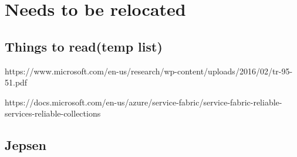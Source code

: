 \documentclass[a4paper,10pt,titlepage]{report}
\begin{document}
%

\pagestyle{empty}

\printbibliography


\chapter{Needs to be relocated}


\section{Things to read(temp list)}

https://www.microsoft.com/en-us/research/wp-content/uploads/2016/02/tr-95-51.pdf

https://docs.microsoft.com/en-us/azure/service-fabric/service-fabric-reliable-services-reliable-collections




\section{Jepsen}
\end{document}
